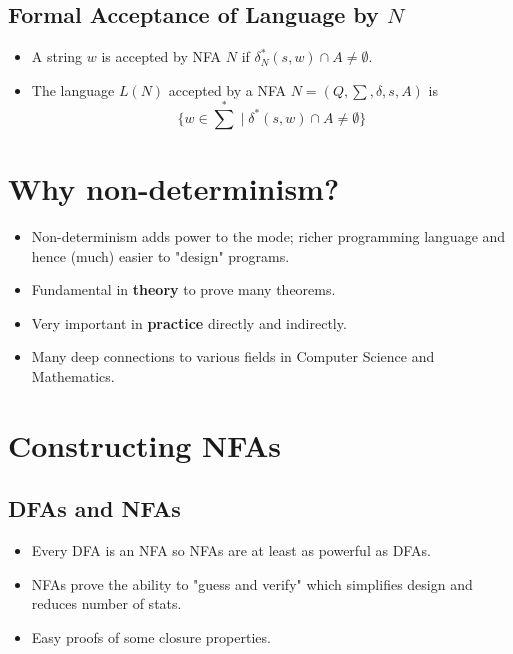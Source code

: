 \subsection{Formal Acceptance of Language by $N$}
\begin{itemize}
    \item A string $w$ is accepted by NFA $N$ if $\delta_N^{\ast}(s, w) \cap A \neq \emptyset$.
    \item The language $L(N)$ accepted by a NFA $N = (Q, \sum, \delta, s, A)$ is
    \begin{equation}
        \textstyle \{ w \in \sum^{\ast} \mid \delta^{\ast}(s, w) \cap A \neq \emptyset \}
    \end{equation}
\end{itemize}

\section{Why non-determinism?}
\begin{itemize}
    \item Non-determinism adds power to the mode; richer programming language and hence (much) easier to "design" programs.
    \item Fundamental in \textbf{theory} to prove many theorems.
    \item Very important in \textbf{practice} directly and indirectly.
    \item Many deep connections to various fields in Computer Science and Mathematics.
\end{itemize}

\section{Constructing NFAs}

\subsection{DFAs and NFAs}
\begin{itemize}
    \item Every DFA is an NFA so NFAs are at least as powerful as DFAs.
    \item NFAs prove the ability to "guess and verify" which simplifies design and reduces number of stats.
    \item Easy proofs of some closure properties.
\end{itemize}

